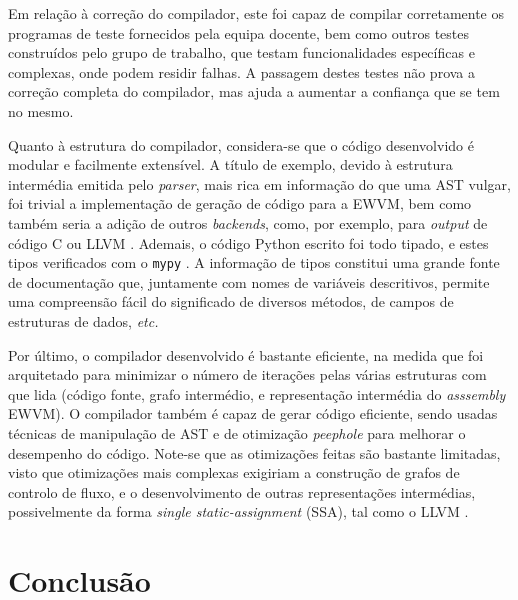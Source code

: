 \documentclass[12pt, a4paper]{article}
\begin{document}
Em relação à correção do compilador, este foi capaz de compilar corretamente os programas de teste
fornecidos pela equipa docente, bem como outros testes construídos pelo grupo de trabalho, que
testam funcionalidades específicas e complexas, onde podem residir falhas. A passagem destes testes
não prova a correção completa do compilador, mas ajuda a aumentar a confiança que se tem no mesmo.

Quanto à estrutura do compilador, considera-se que o código desenvolvido é modular e facilmente
extensível. A título de exemplo, devido à estrutura intermédia emitida pelo \emph{parser}, mais rica
em informação do que uma AST vulgar, foi trivial a implementação de geração de código para a EWVM,
bem como também seria a adição de outros \emph{backends}, como, por exemplo, para \emph{output} de
código C \cite{c} ou LLVM \cite{llvm}. Ademais, o código Python escrito foi todo tipado, e estes
tipos verificados com o \texttt{mypy} \cite{mypy}. A informação de tipos constitui uma grande fonte
de documentação que, juntamente com nomes de variáveis descritivos, permite uma compreensão fácil
do significado de diversos métodos, de campos de estruturas de dados, \emph{etc.}

Por último, o compilador desenvolvido é bastante eficiente, na medida que foi arquitetado para
minimizar o número de iterações pelas várias estruturas com que lida (código fonte, grafo
intermédio, e representação intermédia do \emph{asssembly} EWVM). O compilador também é capaz de
gerar código eficiente, sendo usadas técnicas de manipulação de AST e de otimização \emph{peephole}
para melhorar o desempenho do código. Note-se que as otimizações feitas são bastante limitadas,
visto que otimizações mais complexas exigiriam a construção de grafos de controlo de fluxo, e o
desenvolvimento de outras representações intermédias, possivelmente da forma
\emph{single static-assignment} (SSA), tal como o LLVM \cite{llvm}.

\section{Conclusão}
\end{document}
